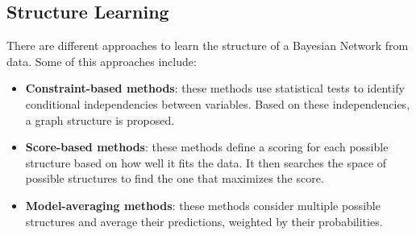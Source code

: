 \subsection{Structure Learning}
There are different approaches to learn the structure of a Bayesian Network from data.
Some of this approaches include:
\begin{itemize}
    \item \textbf{Constraint-based methods}: these methods use statistical tests to 
    identify conditional independencies between variables. 
    Based on these independencies, a graph structure is proposed.
    \item \textbf{Score-based methods}: these methods define a scoring for each possible structure based on how well it fits the data.
    It then searches the space of possible structures to find the one that maximizes the score.
    \item \textbf{Model-averaging methods}: these methods consider multiple possible structures 
    and average their predictions, weighted by their probabilities.
\end{itemize}